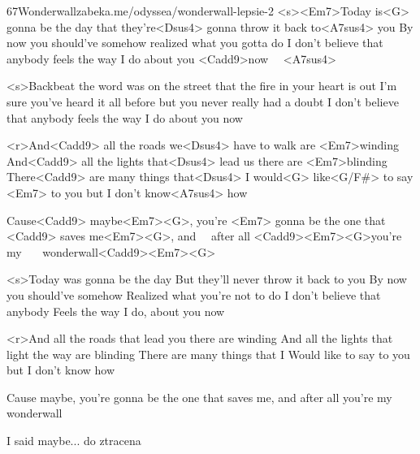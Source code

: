 \begin{song}[Oasis]{67}{Wonderwall}{zabeka.me/odyssea/wonderwall-lepsie-2}
	<s><Em7>Today is<G> gonna be the day
	that they're<Dsus4> gonna throw it back to<A7sus4> you
	By now you should've somehow
	realized what you gotta do
	I don't believe that anybody
	feels the way I do about you <Cadd9>now \ \ <Dsus4><A7sus4>

	<s>Backbeat the word was on the street
	that the fire in your heart is out
	I'm sure you've heard it all before
	but you never really had a doubt
	I don't believe that anybody
	feels the way I do about you now

	<r>And<Cadd9> all the roads we<Dsus4> have to walk are <Em7>winding
	And<Cadd9> all the lights that<Dsus4> lead us there are <Em7>blinding
	There<Cadd9> are many things that<Dsus4> I would<G> like<G/F#> to say <Em7> to you
	but I don't know<A7sus4> how

	Cause<Cadd9> maybe<Em7><G>, you're <Em7> gonna be the one that
	<Cadd9> saves me<Em7><G>, and \ \ <Em7>after all
	<Cadd9><Em7><G>you're my \ \ \ <Em7>wonderwall<Cadd9><Em7><G>

	<s>Today was gonna be the day
	But they'll never throw it back to you
	By now you should've somehow
	Realized what you're not to do
	I don't believe that anybody
	Feels the way I do, about you now

	<r>And all the roads that lead you there are winding
	And all the lights that light the way are blinding
	There are many things that I
	Would like to say to you but I don't know how

	Cause maybe, you're gonna be the one that
	saves me, and after all
	you're my wonderwall

	I said maybe... do ztracena
\end{song}
